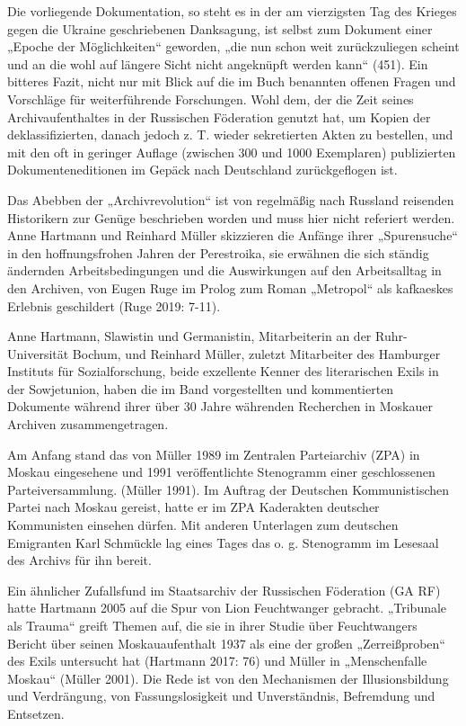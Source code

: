 \newpage
\begin{multicols*}{2}


\noindent Die vorliegende Dokumentation, so steht es in der am vierzigsten Tag des Krieges gegen die Ukraine geschriebenen Danksagung, ist selbst zum Dokument einer „Epoche der Möglichkeiten“ geworden, „die nun schon weit zurückzuliegen scheint und an die wohl auf längere Sicht nicht angeknüpft werden kann“ (451). Ein bitteres Fazit, nicht nur mit Blick auf die im Buch benannten offenen Fragen und Vorschläge für weiterführende Forschungen. Wohl dem, der die Zeit seines Archivaufenthaltes in der Russischen Föderation genutzt hat, um Kopien der deklassifizierten, danach jedoch z. T. wieder sekretierten Akten zu bestellen, und mit den oft in geringer Auflage (zwischen 300 und 1000 Exemplaren) publizierten Dokumenteneditionen im Gepäck nach Deutschland zurückgeflogen ist.

Das Abebben der „Archivrevolution“ ist von regelmäßig nach Russland reisenden Historikern zur Genüge beschrieben worden und muss hier nicht referiert werden. Anne Hartmann und Reinhard Müller skizzieren die Anfänge ihrer „Spurensuche“ in den hoffnungsfrohen Jahren der Perestroika, sie erwähnen die sich ständig ändernden Arbeitsbedingungen und die Auswirkungen auf den Arbeitsalltag in den Archiven, von Eugen Ruge im Prolog zum Roman „Metropol“ als kafkaeskes Erlebnis geschildert (Ruge 2019: 7-11).

Anne Hartmann, Slawistin und Germanistin, Mitarbeiterin an der Ruhr-Universität Bochum, und Reinhard Müller, zuletzt Mitarbeiter des Hamburger Instituts für Sozialforschung, beide exzellente Kenner des literarischen Exils in der Sowjetunion, haben die im Band vorgestellten und kommentierten Dokumente während ihrer über 30 Jahre währenden Recherchen in Moskauer Archiven zusammengetragen.

Am Anfang stand das von Müller 1989 im Zentralen Parteiarchiv (ZPA) in Moskau eingesehene und 1991 veröffentlichte Stenogramm einer geschlossenen Parteiversammlung. (Müller 1991). Im Auftrag der Deutschen Kommunistischen Partei nach Moskau gereist, hatte er im ZPA Kaderakten deutscher Kommunisten einsehen dürfen. Mit anderen Unterlagen zum deutschen Emigranten Karl Schmückle lag eines Tages das o. g. Stenogramm im Lesesaal des Archivs für ihn bereit.

Ein ähnlicher Zufallsfund im Staatsarchiv der Russischen Föderation (GA RF) hatte Hartmann 2005 auf die Spur von Lion Feuchtwanger gebracht. „Tribunale als Trauma“ greift Themen auf, die sie in ihrer Studie über Feuchtwangers Bericht über seinen Moskauaufenthalt 1937 als eine der großen „Zerreißproben“ des Exils untersucht hat (Hartmann 2017: 76) und Müller in „Menschenfalle Moskau“ (Müller 2001). Die Rede ist von den Mechanismen der Illusionsbildung und Verdrängung, von Fassungslosigkeit und Unverständnis, Befremdung und Entsetzen.


\end{multicols*}
